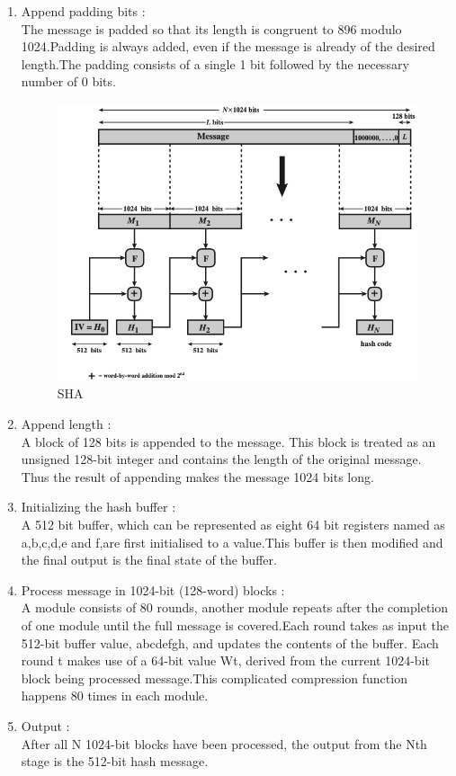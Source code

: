 \documentclass{article}
\begin{document}
\begin{enumerate}
    \item Append padding bits :\\
    The message is padded so that its length is congruent to 896 modulo 1024.Padding is always added, even if the message is already of the desired length.The padding consists of a single 1 bit followed by the necessary number of 0 bits.
    \\
    \begin{figure}
\begin{center}
    
    \includegraphics[scale = 0.5]{images/sha.png}
    \caption{SHA}

\end{center}
 \end{figure}
    \item Append length :\\
    A block of 128 bits is appended to the message. This block is treated as an unsigned 128-bit integer and contains the length of the original message.
    Thus the result of appending makes the message 1024 bits long.
    \item Initializing the hash buffer :\\
    A 512 bit buffer, which can be represented as eight 64 bit registers named as a,b,c,d,e and f,are first initialised to a value.This buffer is then modified and the final output is the final state of the buffer.
    \item Process message in 1024-bit (128-word) blocks :\\
    A module consists of 80 rounds, another module repeats after the completion of one module until the full message is covered.Each round takes as input the 512-bit buffer value, abcdefgh, and updates the contents of the buffer. Each round t makes use of a 64-bit value Wt, derived from the current 1024-bit block being processed message.This complicated compression function happens 80 times in each module.
    \item Output :\\
    After all N 1024-bit blocks have been processed, the output from the Nth stage is the 512-bit hash message.
\end{enumerate}
\end{document}
